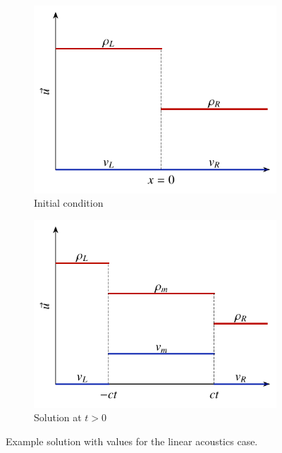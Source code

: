 \begin{figure}[htbp]
	\centering
	\begin{subfigure}[b]{0.49\textwidth}
		\includegraphics[width=\linewidth]{Pictures/riem_linacoustics_u0}
		\caption{Initial condition}
		\label{fig:riem_acoustics_example_u0}
	\end{subfigure}
	\begin{subfigure}[b]{0.49\textwidth}
		\includegraphics[width=\linewidth]{Pictures/riem_linacoustics_sol}
		\caption{Solution at $t>0$}
		\label{fig:riem_acoustics_example_sol}
	\end{subfigure}
	\caption{Example solution with values for the linear acoustics case.}
	\label{fig:riem_acoustics_example}
\end{figure}
